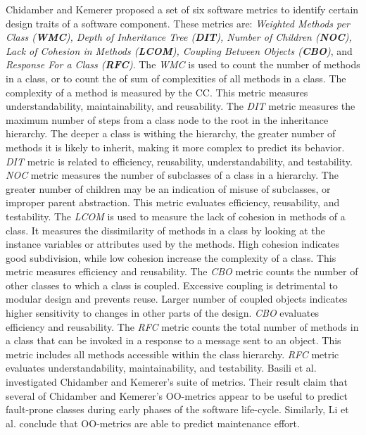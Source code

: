 Chidamber and Kemerer\cite{chidamber1994metrics} proposed a set of six software metrics to identify certain design traits of a software component. These metrics are: \textit{Weighted Methods per Class (\textbf{WMC}), Depth of Inheritance Tree (\textbf{DIT}), Number of Children (\textbf{NOC}), Lack of Cohesion in Methods (\textbf{LCOM}), Coupling Between Objects (\textbf{CBO})}, and \textit{Response For a Class (\textbf{RFC})}. The \textit{WMC} is used to count the number of methods in a class, or to count the of sum of complexities of all methods in a class. The complexity of a method is measured by the CC. This metric measures understandability, maintainability, and reusability\cite{quenelobject}. The \textit{DIT} metric measures the maximum number of steps from a class node to the root in the inheritance hierarchy. The deeper a class is withing the hierarchy, the greater number of methods it is likely to inherit, making it more complex to predict its behavior\cite{quenelobject}. \textit{DIT} metric is related to efficiency, reusability, understandability, and testability\cite{quenelobject}. \textit{NOC} metric measures the number of subclasses of a class in a hierarchy. The greater number of children may be an indication of misuse of subclasses, or improper parent abstraction. This metric evaluates efficiency, reusability, and testability\cite{quenelobject}. The \textit{LCOM} is used to measure the lack of cohesion in methods of a class. It measures the dissimilarity of methods in a class by looking at the instance variables or attributes used by the methods. High cohesion indicates good subdivision, while low cohesion increase the complexity of a class. This metric measures efficiency and reusability\cite{quenelobject}. The \textit{CBO} metric counts the number of other classes to which a class is coupled. Excessive coupling is detrimental to modular design and prevents reuse\cite{quenelobject}. Larger number of coupled objects indicates higher sensitivity to changes in other parts of the design. \textit{CBO} evaluates efficiency and reusability\cite{quenelobject}. The \textit{RFC} metric counts the total number of methods in a class that can be invoked in a response to a message sent to an object. This metric includes all methods accessible within the class hierarchy. \textit{RFC} metric evaluates understandability, maintainability, and testability\cite{quenelobject}. Basili et al.\cite{basili1996validation} investigated Chidamber and Kemerer's suite of metrics. Their result claim that several of Chidamber and Kemerer's OO-metrics appear to be useful to predict fault-prone classes during early phases of the software life-cycle. Similarly, Li et al.\cite{li1993object} conclude that OO-metrics are able to predict maintenance effort.




